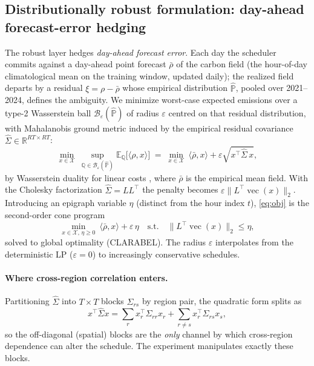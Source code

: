 \documentclass[12pt]{article}
\newcommand{\vecx}{\operatorname{vec}}
\newcommand{\R}{\mathbb{R}}
\newcommand{\E}{\mathbb{E}}
\begin{document}
\subsection{Distributionally robust formulation: day-ahead forecast-error hedging}
The robust layer hedges \emph{day-ahead forecast error}. Each day the scheduler commits
against a day-ahead point forecast $\bar\rho$ of the carbon field (the hour-of-day
climatological mean on the training window, updated daily); the realized field departs
by a residual $\xi=\rho-\bar\rho$ whose empirical distribution $\hat{\mathbb P}$,
pooled over 2021--2024, defines the ambiguity. We minimize worst-case expected
emissions over a type-2 Wasserstein ball $\mathcal{B}_\varepsilon(\hat{\mathbb P})$ of
radius $\varepsilon$ centred on that residual distribution, with Mahalanobis ground
metric induced by the empirical residual covariance $\hat\Sigma\in\R^{RT\times RT}$:
\begin{equation}
\min_{x\in\mathcal{X}}\ \sup_{\mathbb{Q}\in\mathcal{B}_\varepsilon(\hat{\mathbb{P}})}
\E_{\mathbb{Q}}\big[\langle\rho,x\rangle\big]
\;=\;
\min_{x\in\mathcal{X}}\ \langle\bar\rho,x\rangle
+\varepsilon\sqrt{x^\top\hat\Sigma\,x},
\label{eq:obj}
\end{equation}
by Wasserstein duality for linear costs \citep{esfahani2018,blanchet2019}, where
$\bar\rho$ is the empirical mean field. With the Cholesky factorization
$\hat\Sigma=LL^\top$ the penalty becomes $\varepsilon\lVert
L^\top\vecx(x)\rVert_2$. Introducing an epigraph variable $\eta$ (distinct from the
hour index $t$), \eqref{eq:obj} is the second-order cone program
\begin{equation}
\min_{x\in\mathcal X,\,\eta\ge0}\ \langle\bar\rho,x\rangle+\varepsilon\,\eta
\quad\text{s.t.}\quad \big\lVert L^\top\vecx(x)\big\rVert_2\le\eta,
\label{eq:socp}
\end{equation}
solved to global optimality (CLARABEL). The radius $\varepsilon$ interpolates from
the deterministic LP ($\varepsilon=0$) to increasingly conservative schedules.

\paragraph{Where cross-region correlation enters.}
Partitioning $\hat\Sigma$ into $T\times T$ blocks $\Sigma_{rs}$ by region pair, the
quadratic form splits as
\begin{equation}
x^\top\hat\Sigma x=\sum_r x_r^\top\Sigma_{rr}x_r
+\sum_{r\neq s}x_r^\top\Sigma_{rs}x_s,
\label{eq:quad}
\end{equation}
so the off-diagonal (spatial) blocks are the \emph{only} channel by which
cross-region dependence can alter the schedule. The experiment manipulates exactly
these blocks.
\end{document}
